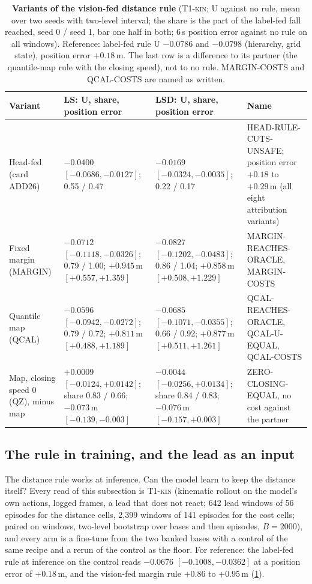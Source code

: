 \documentclass[10pt,twocolumn]{article}
\theoremstyle{remark}
\newcommand{\tier}[1]{\textsc{\small #1}}
\begin{document}
\begin{table}[!tp]
\centering
\caption{\textbf{Variants of the vision-fed distance rule} (\tier{T1-kin}; U against no rule, mean over two seeds with two-level interval; the share is the part of the label-fed fall reached, seed 0 / seed 1, bar one half in both; 6\,s position error against no rule on all windows). Reference: label-fed rule U $-0.0786$ and $-0.0798$ (hierarchy, grid state), position error $+0.18$\,m. The last row is a difference to its partner (the quantile-map rule with the closing speed), not to no rule. MARGIN-COSTS and QCAL-COSTS are named as written.}
\label{tab:vrule}
\scriptsize
\begin{tabularx}{\textwidth}{@{}>{\raggedright\arraybackslash}p{34mm}>{\raggedright\arraybackslash}X>{\raggedright\arraybackslash}X>{\raggedright\arraybackslash}X@{}}
\toprule
Variant & LS: U, share, position error & LSD: U, share, position error & Name \\
\midrule
Head-fed (card ADD26) & $-0.0400$ $[-0.0686,-0.0127]$; 0.55 / 0.47 & $-0.0169$ $[-0.0324,-0.0035]$; 0.22 / 0.17 & HEAD-RULE-CUTS-UNSAFE; position error $+0.18$ to $+0.29$\,m (all eight attribution variants) \\
Fixed margin (MARGIN) & $-0.0712$ $[-0.1118,-0.0326]$; 0.79 / 1.00; $+0.945$\,m $[+0.557,+1.359]$ & $-0.0827$ $[-0.1202,-0.0483]$; 0.86 / 1.04; $+0.858$\,m $[+0.508,+1.229]$ & MARGIN-REACHES-ORACLE, MARGIN-COSTS \\
Quantile map (QCAL) & $-0.0596$ $[-0.0942,-0.0272]$; 0.79 / 0.72; $+0.811$\,m $[+0.488,+1.189]$ & $-0.0685$ $[-0.1071,-0.0355]$; 0.66 / 0.92; $+0.877$\,m $[+0.511,+1.261]$ & QCAL-REACHES-ORACLE, QCAL-U-EQUAL, QCAL-COSTS \\
Map, closing speed 0 (QZ), minus map & $+0.0009$ $[-0.0124,+0.0142]$; share 0.83 / 0.66; $-0.073$\,m $[-0.139,-0.003]$ & $-0.0044$ $[-0.0256,+0.0134]$; share 0.84 / 0.83; $-0.076$\,m $[-0.157,+0.003]$ & ZERO-CLOSING-EQUAL, no cost against the partner \\
\bottomrule
\end{tabularx}
\end{table}

\subsection{The rule in training, and the lead as an input}\label{sec:ruletrain}
The distance rule works at inference. Can the model learn to keep the distance itself? Every read of this subsection is \tier{T1-kin} (kinematic rollout on the model's own actions, logged frames, a lead that does not react; 642 lead windows of 56 episodes for the distance cells, 2,399 windows of 141 episodes for the cost cells; paired on windows, two-level bootstrap over bases and then episodes, $B=2000$), and every arm is a fine-tune from the two banked bases with a control of the same recipe and a rerun of the control as the floor. For reference: the label-fed rule at inference on the control reads $-0.0676$ $[-0.1008,-0.0362]$ at a position error of $+0.18$\,m, and the vision-fed margin rule $+0.86$ to $+0.95$\,m (\cref{tab:vrule}).
\end{document}
